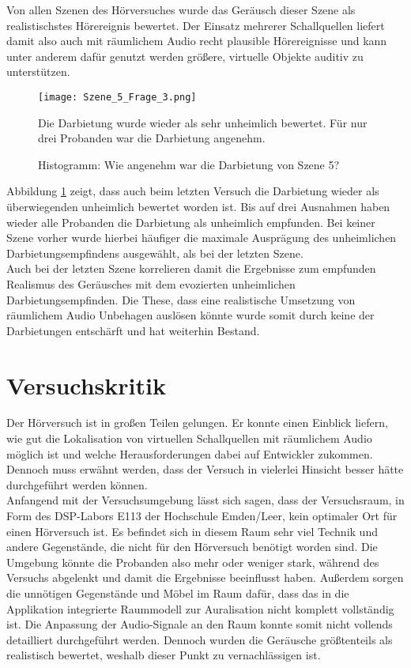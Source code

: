 Von allen Szenen des Hörversuches wurde das Geräusch dieser Szene als realistischstes Hörereignis bewertet. Der Einsatz mehrerer Schallquellen liefert damit also auch mit räumlichem Audio recht plausible Hörereignisse und kann unter anderem dafür genutzt werden größere, virtuelle Objekte auditiv zu unterstützen. \\ 


   \begin{figure}[H]
\centering
\texttt{[image: Szene\_5\_Frage\_3.png]}
\caption{Histogramm: Wie angenehm war die Darbietung von Szene 5?}
Die Darbietung wurde wieder als sehr unheimlich bewertet. Für nur drei Probanden war die Darbietung angenehm.
\label{fig:Szene_5_Frage3}
\end{figure} 
\vspace*{10pt}

Abbildung \ref{fig:Szene_5_Frage3} zeigt, dass auch beim letzten Versuch die Darbietung wieder als überwiegenden unheimlich bewertet worden ist. Bis auf drei Ausnahmen haben wieder alle Probanden die Darbietung als unheimlich empfunden. Bei keiner Szene vorher wurde hierbei häufiger die maximale Ausprägung des unheimlichen Darbietungsempfindens ausgewählt, als bei der letzten Szene.\\ 

Auch bei der letzten Szene korrelieren damit die Ergebnisse zum empfunden Realismus des Geräusches mit dem evozierten unheimlichen Darbietungsempfinden. Die These, dass eine realistische Umsetzung von räumlichem Audio Unbehagen auslösen könnte wurde somit durch keine der Darbietungen entschärft und hat weiterhin Bestand. 
\section{Versuchskritik}
Der Hörversuch ist in großen Teilen gelungen. Er konnte einen Einblick liefern, wie gut die Lokalisation von virtuellen Schallquellen mit räumlichem Audio möglich ist und welche Herausforderungen dabei auf Entwickler zukommen. Dennoch muss erwähnt werden, dass der Versuch in vielerlei Hinsicht besser hätte durchgeführt werden können. \\

Anfangend mit der Versuchsumgebung lässt sich sagen, dass der Versuchsraum, in Form des DSP-Labors E113 der Hochschule Emden/Leer, kein optimaler Ort für einen Hörversuch ist. Es befindet sich in diesem Raum sehr viel Technik und andere Gegenstände, die nicht für den Hörversuch benötigt worden sind. Die Umgebung könnte die Probanden also mehr oder weniger stark, während des Versuchs abgelenkt und damit die Ergebnisse beeinflusst haben. Außerdem sorgen die unnötigen Gegenstände und Möbel im Raum dafür, dass das in die Applikation integrierte Raummodell zur Auralisation nicht komplett vollständig ist. Die Anpassung der Audio-Signale an den Raum konnte somit nicht vollends detailliert durchgeführt werden. Dennoch wurden die Geräusche größtenteils als realistisch bewertet, weshalb dieser Punkt zu vernachlässigen ist. \\

